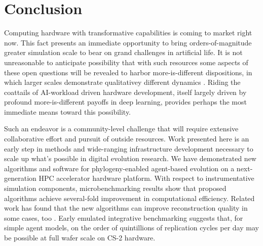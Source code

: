 \section{Conclusion} \label{sec:conclusion}

Computing hardware with transformative capabilities is coming to market right now.
This fact presents an immediate opportunity to bring orders-of-magnitude greater simulation scale to bear on grand challenges in artificial life.
It is not unreasonable to anticipate possibility that with such resources some aspects of these open questions will be revealed to harbor more-is-different dispositions, in which larger scales demonstrate qualitativey different dynamics \citep{anderson1972more}.
Riding the coattails of AI-workload driven hardware development, itself largely driven by profound more-is-different payoffs in deep learning, provides perhaps the most immediate means toward this possibility.

Such an endeavor is a community-level challenge that will require extensive collaborative effort and pursuit of outside resources.
Work presented here is an early step in methods and wide-ranging infrastructure development necessary to scale up what's possible in digital evolution research.
We have demonstrated new algorithms and software for phylogeny-enabled agent-based evolution on a next-generation HPC accelerator hardware platform.
With respect to instrumentative simulation components, microbenchmarking results show that proposed algorithms achieve several-fold improvement in computational efficiency.
Related work has found that the new algorithms can improve reconstruction quality in some cases, too \citep{moreno2024guide}.
Early emulated integrative benchmarking suggests that, for simple agent models, on the order of quintillions of replication cycles per day may be possible at full wafer scale on CS-2 hardware.

